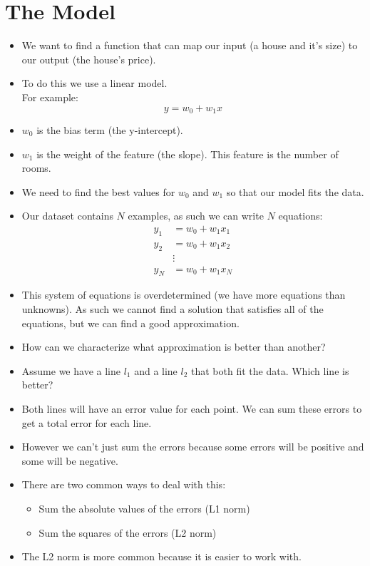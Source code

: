 \documentclass[12pt]{article}
\begin{document}
    \section{The Model}
        \begin{itemize}
            \item We want to find a function that can map our input (a house and it's size) to our output (the house's price).
            \item To do this we use a linear model.
            \\For example:
            \begin{equation}
                y = w_0 + w_1x
            \end{equation}
            \item $w_0$ is the bias term (the y-intercept).
            \item $w_1$ is the weight of the feature (the slope). This feature is the number of rooms.
            \item We need to find the best values for $w_0$ and $w_1$ so that our model fits the data.
            \item Our dataset contains $N$ examples, as such we can write $N$ equations:
            \begin{align*}
                y_1 &= w_0 + w_1x_1\\
                y_2 &= w_0 + w_1x_2\\
                &\vdots\\
                y_N &= w_0 + w_1x_N
            \end{align*}
            \item This system of equations is overdetermined (we have more equations than unknowns). As such we cannot find a solution that satisfies all of the equations, but we can find a good approximation.
            \item How can we characterize what approximation is better than another?
            \item Assume we have a line $l_1$ and a line $l_2$ that both fit the data. Which line is better?
            \item Both lines will have an error value for each point. We can sum these errors to get a total error for each line.
            \item However we can't just sum the errors because some errors will be positive and some will be negative.
            \item There are two common ways to deal with this:
            \begin{itemize}
                \item Sum the absolute values of the errors (L1 norm)
                \item Sum the squares of the errors (L2 norm)
            \end{itemize}
            \item The L2 norm is more common because it is easier to work with.
        \end{itemize}
\end{document}
